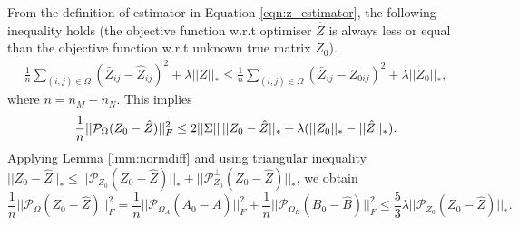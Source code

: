 \documentclass{article} %
\newcommand\mc{\mathcal} %
\begin{document}
From the definition of estimator in Equation \ref{eqn:z_estimator}, the following inequality holds (the objective function  w.r.t optimiser $\hat{Z}$ is always less or equal than the objective function w.r.t unknown true matrix $Z_0$).
\begin{align}
\frac{1}{n} \sum_{(i,j) \in \Omega}(\bar{Z}_{ij} - \hat{Z}_{ij})^2 + \lambda ||\hat{Z}||_* 
\leq \frac{1}{n} \sum_{(i,j) \in \Omega}(\bar{Z}_{ij} - {Z}_{0ij})^2 + \lambda ||Z_0||_*,
\end{align}
where $n = n_M + n_N$. This implies
\begin{equation}
\frac{1}{n}||\mathcal{P}_\Omega(Z_0 - \hat{Z}) ||_F^2 \leq 2||\Sigma||\,||Z_0 - \hat{Z}||_* + \lambda(||Z_0||_* - ||\hat{Z}||_*). \\
\end{equation}
Applying Lemma \ref{lmm:normdiff} and using triangular inequality $||Z_0 - \hat{Z}||_* \leq ||\mc{P}_{Z_0}(Z_0 - \hat{Z})||_* + ||\mc{P}_{Z_0}^\perp(Z_0 - \hat{Z})||_*$, we obtain
\begin{equation}
\frac{1}{n}||\mathcal{P}_\Omega(Z_0 - \hat{Z}) ||_F^2 = \frac{1}{n}||\mc{P}_{\Omega_A}(A_0-\hat{A})||_F^2 + \frac{1}{n}||\mc{P}_{\Omega_B}(B_0-\hat{B})||_F^2
\leq \frac{5}{3}\lambda ||\mc{P}_{Z_0}(Z_0-\hat{Z})||_*.
\label{eqn:tri}
\end{equation}
\end{document}
